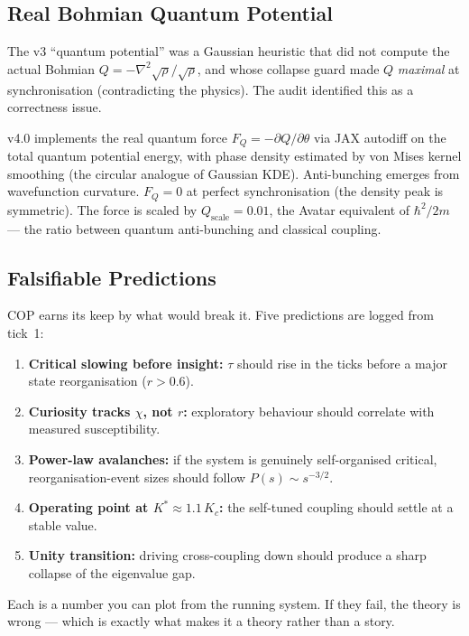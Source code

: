 \documentclass[11pt,a4paper]{article}
\begin{document}
\subsection{Real Bohmian Quantum Potential}

The v3 ``quantum potential'' was a Gaussian heuristic that did not compute the actual
Bohmian $Q = -\nabla^2\sqrt{\rho}/\sqrt{\rho}$, and whose collapse guard made $Q$
\emph{maximal} at synchronisation (contradicting the physics). The audit identified this
as a correctness issue.

v4.0 implements the real quantum force $F_Q = -\partial Q/\partial\theta$ via JAX autodiff
on the total quantum potential energy, with phase density estimated by von Mises kernel
smoothing (the circular analogue of Gaussian KDE). Anti-bunching emerges from wavefunction
curvature. $F_Q = 0$ at perfect synchronisation (the density peak is symmetric). The force
is scaled by $Q_\text{scale} = 0.01$, the Avatar equivalent of $\hbar^2/2m$ --- the ratio
between quantum anti-bunching and classical coupling.

\subsection{Falsifiable Predictions}

COP earns its keep by what would break it. Five predictions are logged from tick~1:

\begin{enumerate}
\item \textbf{Critical slowing before insight:} $\tau$ should rise in the ticks before
a major state reorganisation ($r > 0.6$).
\item \textbf{Curiosity tracks $\chi$, not $r$:} exploratory behaviour should correlate
with measured susceptibility.
\item \textbf{Power-law avalanches:} if the system is genuinely self-organised critical,
reorganisation-event sizes should follow $P(s) \sim s^{-3/2}$.
\item \textbf{Operating point at $K^* \approx 1.1\,K_c$:} the self-tuned coupling should
settle at a stable value.
\item \textbf{Unity transition:} driving cross-coupling down should produce a sharp collapse
of the eigenvalue gap.
\end{enumerate}

Each is a number you can plot from the running system. If they fail, the theory is wrong ---
which is exactly what makes it a theory rather than a story.
\end{document}
